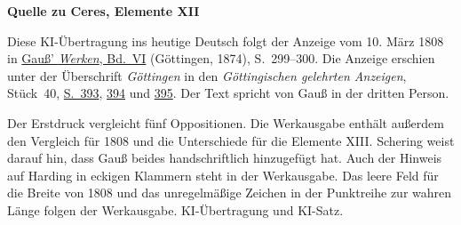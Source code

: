 \clearpage\thispagestyle{empty}
\begin{center}\textbf{Quelle zu Ceres, Elemente XII}\end{center}
\noindent Diese KI-Übertragung ins heutige Deutsch folgt der Anzeige vom 10. März 1808 in \href{https://gdz.sub.uni-goettingen.de/id/PPN236007467}{Gauß’ \textit{Werken}, Bd.~VI} (Göttingen, 1874), S.~299--300. Die Anzeige erschien unter der Überschrift \textit{Göttingen} in den \textit{Göttingischen gelehrten Anzeigen}, Stück~40, \href{https://manifests.sub.uni-goettingen.de/iiif/image/gdz:PPN319721507_1808:00000397/full/1600,/0/default.jpg}{S.~393}, \href{https://manifests.sub.uni-goettingen.de/iiif/image/gdz:PPN319721507_1808:00000398/full/1600,/0/default.jpg}{394} und \href{https://manifests.sub.uni-goettingen.de/iiif/image/gdz:PPN319721507_1808:00000399/full/1600,/0/default.jpg}{395}. Der Text spricht von Gauß in der dritten Person.
\par\medskip
Der Erstdruck vergleicht fünf Oppositionen. Die Werkausgabe enthält außerdem den Vergleich für 1808 und die Unterschiede für die Elemente XIII. Schering weist darauf hin, dass Gauß beides handschriftlich hinzugefügt hat. Auch der Hinweis auf Harding in eckigen Klammern steht in der Werkausgabe. Das leere Feld für die Breite von 1808 und das unregelmäßige Zeichen in der Punktreihe zur wahren Länge folgen der Werkausgabe. KI-Übertragung und KI-Satz.
\clearpage
